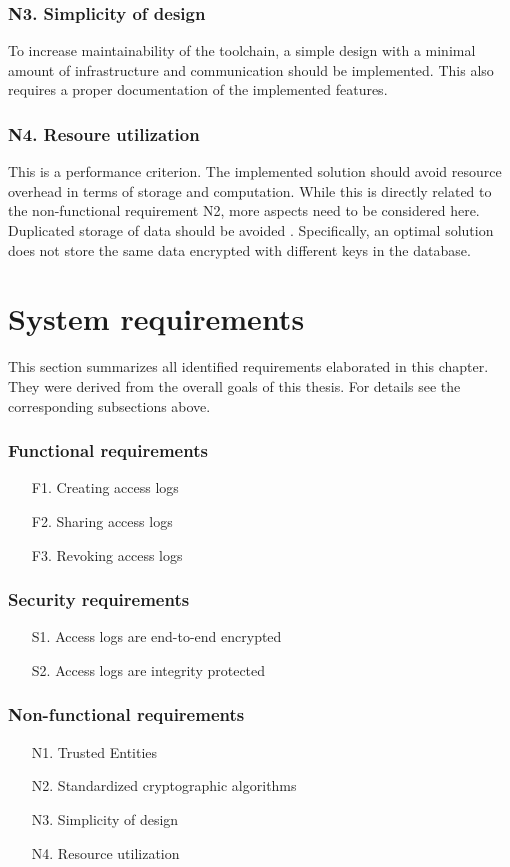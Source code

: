 \documentclass[../main.tex]{subfiles}
\begin{document}
\subsubsection{N3. Simplicity of design}
To increase maintainability of the toolchain, a simple design with a minimal amount of infrastructure and communication should be implemented.
This also requires a proper documentation of the implemented features.

\subsubsection{N4. Resoure utilization}
This is a performance criterion.
The implemented solution should avoid resource overhead in terms of storage and computation.
While this is directly related to the non-functional requirement N2, more aspects need to be considered here.
Duplicated storage of data should be avoided .
Specifically, an optimal solution does not store the same data encrypted with different keys in the database.


\section{System requirements}\label{system-requriements}
This section summarizes all identified requirements elaborated in this chapter.
They were derived from the overall goals of this thesis.
For details see the corresponding subsections above.

\subsubsection{Functional requirements}
\begin{itemize}
    \item [F1.] Creating access logs
    \item [F2.] Sharing access logs
    \item [F3.] Revoking access logs
\end{itemize}

\subsubsection{Security requirements}
\begin{itemize}
    \item [S1.] Access logs are end-to-end encrypted
    \item [S2.] Access logs are integrity protected
\end{itemize}

\subsubsection{Non-functional requirements}
\begin{itemize}
    \item [N1.] Trusted Entities
    \item [N2.] Standardized cryptographic algorithms
    \item [N3.] Simplicity of design
    \item [N4.] Resource utilization
\end{itemize}
\end{document}
